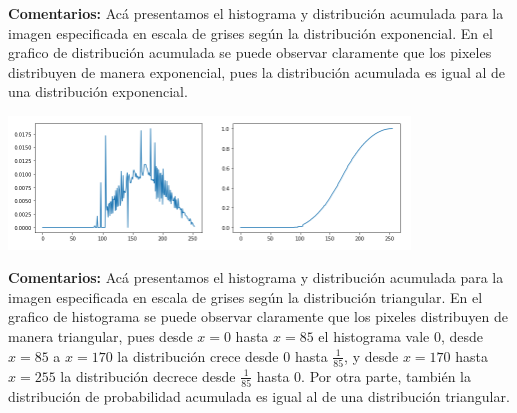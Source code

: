 \documentclass[11pt]{article}
\begin{document}
\textbf{Comentarios:} Acá presentamos el histograma y distribución acumulada para la imagen especificada   en escala de grises según la distribución exponencial. En el grafico de distribución acumulada se puede observar claramente que los pixeles distribuyen de manera exponencial, pues la distribución acumulada es igual al de una distribución exponencial. \\

\begin{center}
\includegraphics[width=0.8\textwidth]{./figures/grafico_neymar_triangular}
\end{center}

\textbf{Comentarios:} Acá presentamos el histograma y distribución acumulada para la imagen especificada   en escala de grises según la distribución triangular. En el grafico de histograma se puede observar claramente que los pixeles distribuyen de manera triangular, pues desde $ x = 0 $ hasta $ x = 85 $ el histograma vale $ 0 $, desde $ x = 85 $ a $ x = 170 $ la distribución crece desde $ 0 $ hasta $ \frac{1}{85} $, y desde $ x = 170 $ hasta $ x = 255 $ la distribución decrece desde $ \frac{1}{85} $ hasta $ 0 $. Por otra parte, también la distribución de probabilidad acumulada es igual al de una distribución triangular. \\
\end{document}
